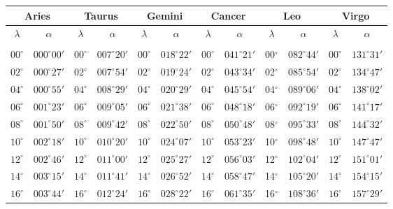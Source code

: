 \clearpage
\begin{table}[!h]
\vspace{0.25cm}
\centering
{\scriptsize \begin{tabular}{cc|cc|cc|cc|cc|cc}
\multicolumn{2}{c}{Aries}\vline & \multicolumn{2}{c}{Taurus} \vline& \multicolumn{2}{c}{Gemini} \vline& \multicolumn{2}{c}{Cancer}\vline &
\multicolumn{2}{c}{Leo}\vline & \multicolumn{2}{c}{Virgo}\\\hline
$\lambda$& $\alpha$& $\lambda$& $\alpha$& $\lambda$& $\alpha$& $\lambda$& $\alpha$& $\lambda$& $\alpha$& $\lambda$& $\alpha$\\\hline
&&&&&&&&&&&\\[-2ex]
$00^\circ$ & $000^\circ00'$ & $00^\circ$ & $007^\circ20'$ & $00^\circ$ & $018^\circ22'$ & $00^\circ$ & $041^\circ21'$ & 00$^\circ$ & $082^\circ44'$ & $00^\circ$ & $131^\circ31'$\\
$02^\circ$ & $000^\circ27'$ & $02^\circ$ & $007^\circ54'$ & $02^\circ$ & $019^\circ24'$ & $02^\circ$ & $043^\circ34'$ & 02$^\circ$ & $085^\circ54'$ & $02^\circ$ & $134^\circ47'$\\
$04^\circ$ & $000^\circ55'$ & $04^\circ$ & $008^\circ29'$ & $04^\circ$ & $020^\circ29'$ & $04^\circ$ & $045^\circ54'$ & 04$^\circ$ & $089^\circ06'$ & $04^\circ$ & $138^\circ02'$\\
$06^\circ$ & $001^\circ23'$ & $06^\circ$ & $009^\circ05'$ & $06^\circ$ & $021^\circ38'$ & $06^\circ$ & $048^\circ18'$ & 06$^\circ$ & $092^\circ19'$ & $06^\circ$ & $141^\circ17'$\\
$08^\circ$ & $001^\circ50'$ & $08^\circ$ & $009^\circ42'$ & $08^\circ$ & $022^\circ50'$ & $08^\circ$ & $050^\circ48'$ & 08$^\circ$ & $095^\circ33'$ & $08^\circ$ & $144^\circ32'$\\
$10^\circ$ & $002^\circ18'$ & $10^\circ$ & $010^\circ20'$ & $10^\circ$ & $024^\circ07'$ & $10^\circ$ & $053^\circ23'$ & 10$^\circ$ & $098^\circ48'$ & $10^\circ$ & $147^\circ47'$\\
$12^\circ$ & $002^\circ46'$ & $12^\circ$ & $011^\circ00'$ & $12^\circ$ & $025^\circ27'$ & $12^\circ$ & $056^\circ03'$ & 12$^\circ$ & $102^\circ04'$ & $12^\circ$ & $151^\circ01'$\\
$14^\circ$ & $003^\circ15'$ & $14^\circ$ & $011^\circ41'$ & $14^\circ$ & $026^\circ52'$ & $14^\circ$ & $058^\circ47'$ & 14$^\circ$ & $105^\circ20'$ & $14^\circ$ & $154^\circ15'$\\
$16^\circ$ & $003^\circ44'$ & $16^\circ$ & $012^\circ24'$ & $16^\circ$ & $028^\circ22'$ & $16^\circ$ & $061^\circ35'$ & 16$^\circ$ & $108^\circ36'$ & $16^\circ$ & $157^\circ29'$\\

\end{tabular}}
\end{table}
